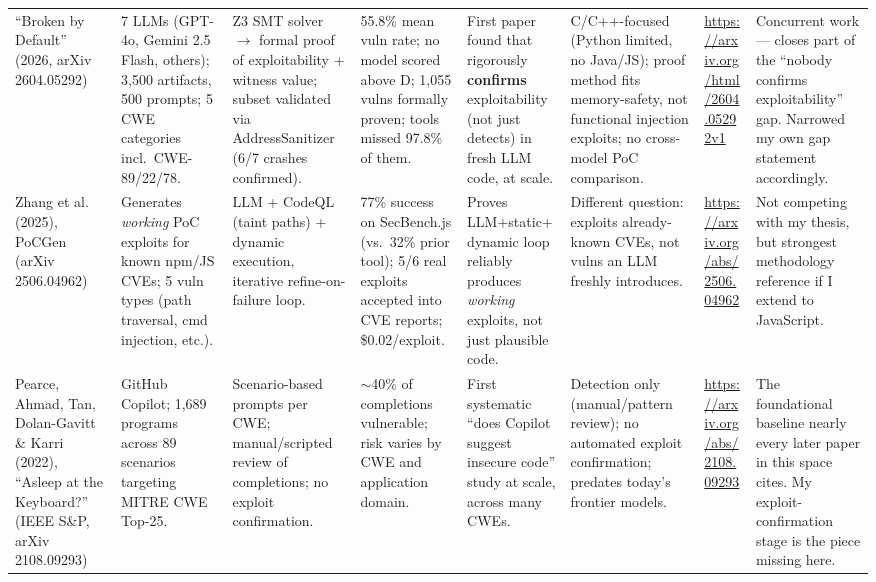 \documentclass[10pt]{article}
\begin{document}
\begin{landscape}
\begin{longtable}{
  P{2.6cm}
  P{3.6cm}
  P{3.2cm}
  P{4.0cm}
  P{3.0cm}
  P{3.0cm}
  P{2.2cm}
  P{3.6cm}
}
``Broken by Default'' (2026, arXiv 2604.05292)
&
7 LLMs (GPT-4o, Gemini 2.5 Flash, others); 3{,}500 artifacts, 500 prompts; 5 CWE categories incl.\ CWE-89/22/78.
&
Z3 SMT solver $\to$ formal proof of exploitability + witness value; subset validated via AddressSanitizer (6/7 crashes confirmed).
&
55.8\% mean vuln rate; no model scored above D; 1{,}055 vulns formally proven; tools missed 97.8\% of them.
&
First paper found that rigorously \textbf{confirms} exploitability (not just detects) in fresh LLM code, at scale.
&
C/C++-focused (Python limited, no Java/JS); proof method fits memory-safety, not functional injection exploits; no cross-model PoC comparison.
&
\url{https://arxiv.org/html/2604.05292v1}
&
Concurrent work --- closes part of the ``nobody confirms exploitability'' gap. Narrowed my own gap statement accordingly.
\\[4pt]

Zhang et al. (2025), PoCGen (arXiv 2506.04962)
&
Generates \emph{working} PoC exploits for known npm/JS CVEs; 5 vuln types (path traversal, cmd injection, etc.).
&
LLM + CodeQL (taint paths) + dynamic execution, iterative refine-on-failure loop.
&
77\% success on SecBench.js (vs.\ 32\% prior tool); 5/6 real exploits accepted into CVE reports; \$0.02/exploit.
&
Proves LLM+static+dynamic loop reliably produces \emph{working} exploits, not just plausible code.
&
Different question: exploits already-known CVEs, not vulns an LLM freshly introduces.
&
\url{https://arxiv.org/abs/2506.04962}
&
Not competing with my thesis, but strongest methodology reference if I extend to JavaScript.
\\[4pt]

Pearce, Ahmad, Tan, Dolan-Gavitt \& Karri (2022), ``Asleep at the Keyboard?'' (IEEE S\&P, arXiv 2108.09293)
&
GitHub Copilot; 1{,}689 programs across 89 scenarios targeting MITRE CWE Top-25.
&
Scenario-based prompts per CWE; manual/scripted review of completions; no exploit confirmation.
&
$\sim$40\% of completions vulnerable; risk varies by CWE and application domain.
&
First systematic ``does Copilot suggest insecure code'' study at scale, across many CWEs.
&
Detection only (manual/pattern review); no automated exploit confirmation; predates today's frontier models.
&
\url{https://arxiv.org/abs/2108.09293}
&
The foundational baseline nearly every later paper in this space cites. My exploit-confirmation stage is the piece missing here.
\\[4pt]


\end{longtable}
\end{landscape}
\end{document}
